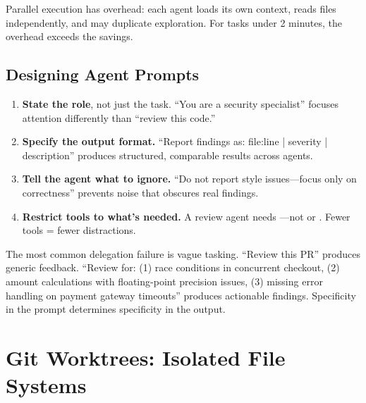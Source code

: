 \noindent Parallel execution has overhead: each agent loads its own
context, reads files independently, and may duplicate exploration.
For tasks under 2 minutes, the overhead exceeds the savings.


\subsection*{Designing Agent Prompts}

\begin{enumerate}
  \item \textbf{State the role}, not just the task.
    ``You are a security specialist'' focuses attention differently
    than ``review this code.''
  \item \textbf{Specify the output format.}
    ``Report findings as: file:line | severity | description''
    produces structured, comparable results across agents.
  \item \textbf{Tell the agent what to ignore.}
    ``Do not report style issues---focus only on correctness''
    prevents noise that obscures real findings.
  \item \textbf{Restrict tools to what's needed.}
    A review agent needs ---not 
    or . Fewer tools = fewer distractions.
\end{enumerate}

\begin{keyinsight}
The most common delegation failure is vague tasking.
``Review this PR'' produces generic feedback.
``Review  for: (1) race conditions in concurrent
checkout, (2) amount calculations with floating-point precision issues,
(3) missing error handling on payment gateway timeouts'' produces
actionable findings. Specificity in the prompt determines specificity
in the output.
\end{keyinsight}

\section{Git Worktrees: Isolated File Systems}
\label{sec:worktrees}

